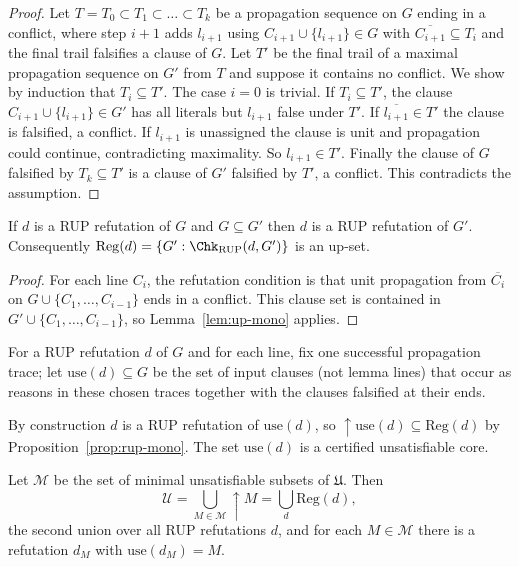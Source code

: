 \begin{proof}
Let $T=T_0\subset T_1\subset\dots\subset T_k$ be a propagation sequence on $G$ ending in a conflict, where step $i+1$ adds $l_{i+1}$ using $C_{i+1}\cup\{l_{i+1}\}\in G$ with $\overline{C_{i+1}}\subseteq T_i$ and the final trail falsifies a clause of $G$. Let $T'$ be the final trail of a maximal propagation sequence on $G'$ from $T$ and suppose it contains no conflict. We show by induction that $T_i\subseteq T'$. The case $i=0$ is trivial. If $T_i\subseteq T'$, the clause $C_{i+1}\cup\{l_{i+1}\}\in G'$ has all literals but $l_{i+1}$ false under $T'$. If $\overline{l_{i+1}}\in T'$ the clause is falsified, a conflict. If $l_{i+1}$ is unassigned the clause is unit and propagation could continue, contradicting maximality. So $l_{i+1}\in T'$. Finally the clause of $G$ falsified by $T_k\subseteq T'$ is a clause of $G'$ falsified by $T'$, a conflict. This contradicts the assumption.
\end{proof}

\begin{proposition}
\label{prop:rup-mono}
If $d$ is a RUP refutation of $G$ and $G\subseteq G'$ then $d$ is a RUP refutation of $G'$. Consequently $\mathrm{Reg}(d)=\{G':\Chk_{\mathrm{RUP}}(d,G')\}$ is an up-set.
\end{proposition}

\begin{proof}
For each line $C_i$, the refutation condition is that unit propagation from $\overline{C_i}$ on $G\cup\{C_1,\dots,C_{i-1}\}$ ends in a conflict. This clause set is contained in $G'\cup\{C_1,\dots,C_{i-1}\}$, so Lemma~\ref{lem:up-mono} applies.
\end{proof}

\begin{definition}
\label{def:used}
For a RUP refutation $d$ of $G$ and for each line, fix one successful propagation trace; let $\mathrm{use}(d)\subseteq G$ be the set of input clauses (not lemma lines) that occur as reasons in these chosen traces together with the clauses falsified at their ends.
\end{definition}

By construction $d$ is a RUP refutation of $\mathrm{use}(d)$, so $\uparrow\mathrm{use}(d)\subseteq\mathrm{Reg}(d)$ by Proposition~\ref{prop:rup-mono}. The set $\mathrm{use}(d)$ is a certified unsatisfiable core.

\begin{theorem}
\label{thm:mus-union}
Let $\mathcal M$ be the set of minimal unsatisfiable subsets of $\mathfrak U$. Then
\[
\mathcal U=\bigcup_{M\in\mathcal M}\uparrow M=\bigcup_d\mathrm{Reg}(d),
\]
the second union over all RUP refutations $d$, and for each $M\in\mathcal M$ there is a refutation $d_M$ with $\mathrm{use}(d_M)=M$.
\end{theorem}

